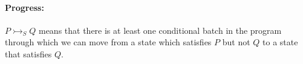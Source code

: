 \begin{code}
    \>[2]\AgdaSpace{}%
    \AgdaSymbol{:}\AgdaSpace{}%
    \AgdaSpace{}%
    \AgdaSpace{}%
    \AgdaSpace{}%
    \AgdaSpace{}%
    \AgdaSpace{}%
    \AgdaSpace{}%
    \<%
    \\
    \>[2]\AgdaSpace{}%
    \AgdaSpace{}%
    \AgdaSpace{}%
    \AgdaSpace{}%
    \AgdaSymbol{=}\AgdaSpace{}%
    \AgdaSpace{}%
    \AgdaSymbol{(}\AgdaSpace{}%
    \AgdaSpace{}%
    \AgdaSymbol{(}\AgdaSpace{}%
    \AgdaSymbol{))}\AgdaSpace{}%
    \AgdaSpace{}%
    \AgdaSpace{}%
    \AgdaSymbol{(}\AgdaSpace{}%
    \AgdaSymbol{(}\AgdaSpace{}%
    \AgdaOperator{\AgdaInductiveConstructor{,}}\AgdaSpace{}%
    \AgdaSpace{}%
    \AgdaSpace{}%
    \AgdaSymbol{))}\<%
    \\
    \\[\AgdaEmptyExtraSkip]%
    \>[2]\AgdaSpace{}%
    \AgdaSpace{}%
    \<%
    \\
    \>[2]\AgdaSpace{}%
    \AgdaSymbol{:}\AgdaSpace{}%
    \AgdaSpace{}%
    \AgdaSpace{}%
    \AgdaSpace{}%
    \AgdaSpace{}%
    \AgdaSpace{}%
    \AgdaSpace{}%
    \<%
    \\
    \>[2]\AgdaSpace{}%
    \AgdaOperator{\AgdaFunction{▷[}}\AgdaSpace{}%
    \AgdaSpace{}%
    \AgdaOperator{\AgdaFunction{]}}\AgdaSpace{}%
    \AgdaSpace{}%
    \AgdaSymbol{=}\AgdaSpace{}%
    \AgdaSpace{}%
    \AgdaSpace{}%
    \AgdaSpace{}%
    \<%
\end{code}

\paragraph{Progress:}
$P \rightarrowtail_S Q$ means that there is at least one conditional batch in the program through which we can move from a state which satisfies $P$ but not $Q$ to a state that satisfies $Q$.


